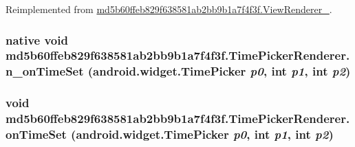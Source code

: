 Reimplemented from \hyperlink{classmd5b60ffeb829f638581ab2bb9b1a7f4f3f_1_1_view_renderer__2_dae20979ac761a65aa60c9b427509c37}{md5b60ffeb829f638581ab2bb9b1a7f4f3f.ViewRenderer\_}.\hypertarget{classmd5b60ffeb829f638581ab2bb9b1a7f4f3f_1_1_time_picker_renderer_2169d0643bdc07403d1330e5ebaf4ba5}{
\subsubsection[{n\_\-onTimeSet}]{\setlength{\rightskip}{0pt plus 5cm}native void md5b60ffeb829f638581ab2bb9b1a7f4f3f.TimePickerRenderer.n\_\-onTimeSet (android.widget.TimePicker {\em p0}, \/  int {\em p1}, \/  int {\em p2})}}
\label{classmd5b60ffeb829f638581ab2bb9b1a7f4f3f_1_1_time_picker_renderer_2169d0643bdc07403d1330e5ebaf4ba5}


\hypertarget{classmd5b60ffeb829f638581ab2bb9b1a7f4f3f_1_1_time_picker_renderer_c2ef26492e19e4ba5a31033d11ae8a6a}{
\subsubsection[{onTimeSet}]{\setlength{\rightskip}{0pt plus 5cm}void md5b60ffeb829f638581ab2bb9b1a7f4f3f.TimePickerRenderer.onTimeSet (android.widget.TimePicker {\em p0}, \/  int {\em p1}, \/  int {\em p2})}}
\label{classmd5b60ffeb829f638581ab2bb9b1a7f4f3f_1_1_time_picker_renderer_c2ef26492e19e4ba5a31033d11ae8a6a}




